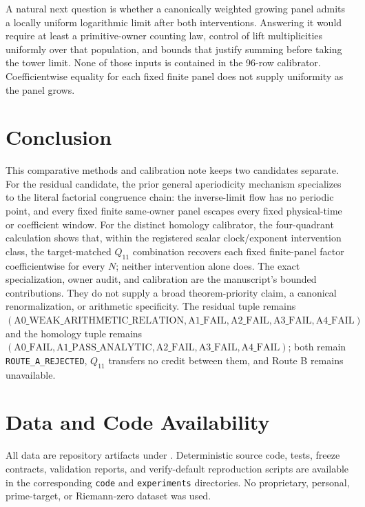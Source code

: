 \documentclass[11pt]{article}
\theoremstyle{definition}
\theoremstyle{remark}
\begin{document}
A natural next question is whether a canonically weighted growing panel admits a locally uniform logarithmic limit after both interventions. Answering it would require at least a primitive-owner counting law, control of lift multiplicities uniformly over that population, and bounds that justify summing before taking the tower limit. None of those inputs is contained in the 96-row calibrator. Coefficientwise equality for each fixed finite panel does not supply uniformity as the panel grows.

\section{Conclusion}

This comparative methods and calibration note keeps two candidates separate. For the residual candidate, the prior general aperiodicity mechanism specializes to the literal factorial congruence chain: the inverse-limit flow has no periodic point, and every fixed finite same-owner panel escapes every fixed physical-time or coefficient window. For the distinct homology calibrator, the four-quadrant calculation shows that, within the registered scalar clock/exponent intervention class, the target-matched $Q_{11}$ combination recovers each fixed finite-panel factor coefficientwise for every $N$; neither intervention alone does. The exact specialization, owner audit, and calibration are the manuscript's bounded contributions. They do not supply a broad theorem-priority claim, a canonical renormalization, or arithmetic specificity. The residual tuple remains $(\mathrm{A0\_WEAK\_ARITHMETIC\_RELATION},\mathrm{A1\_FAIL},\mathrm{A2\_FAIL},\mathrm{A3\_FAIL},\mathrm{A4\_FAIL})$ and the homology tuple remains $(\mathrm{A0\_FAIL},\mathrm{A1\_PASS\_ANALYTIC},\mathrm{A2\_FAIL},\mathrm{A3\_FAIL},\mathrm{A4\_FAIL})$; both remain \texttt{ROUTE\_A\_REJECTED}, $Q_{11}$ transfers no credit between them, and Route B remains unavailable.

\section*{Data and Code Availability}
All data are repository artifacts under . Deterministic source code, tests, freeze contracts, validation reports, and verify-default reproduction scripts are available in the corresponding \texttt{code} and \texttt{experiments} directories. No proprietary, personal, prime-target, or Riemann-zero dataset was used.
\end{document}
